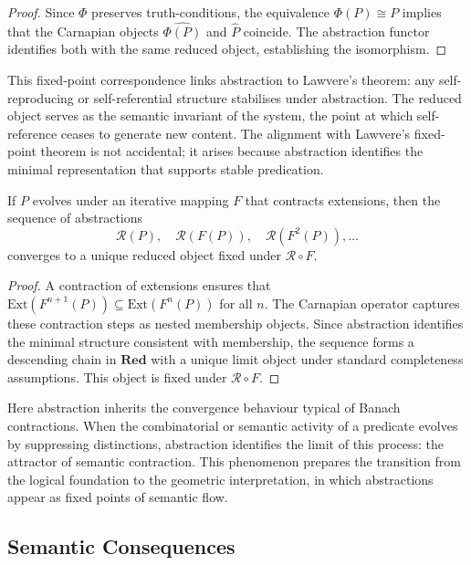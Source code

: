 \documentclass[12pt,letterpaper]{article}
\begin{document}
\begin{proof}
Since $\Phi$ preserves truth-conditions, the equivalence $\Phi(P) \cong P$ implies that the Carnapian objects $\hat{\Phi(P)}$ and $\hat{P}$ coincide. The abstraction functor identifies both with the same reduced object, establishing the isomorphism.
\end{proof}

This fixed-point correspondence links abstraction to Lawvere’s theorem: any self-reproducing or self-referential structure stabilises under abstraction. The reduced object serves as the semantic invariant of the system, the point at which self-reference ceases to generate new content. The alignment with Lawvere’s fixed-point theorem is not accidental; it arises because abstraction identifies the minimal representation that supports stable predication.

\begin{corollary}
If $P$ evolves under an iterative mapping $F$ that contracts extensions, then the sequence of abstractions
\[
\mathcal{R}(P), \quad \mathcal{R}(F(P)), \quad \mathcal{R}(F^2(P)), \dots
\]
converges to a unique reduced object fixed under $\mathcal{R} \circ F$.
\end{corollary}

\begin{proof}
A contraction of extensions ensures that $\mathrm{Ext}(F^{n+1}(P)) \subseteq \mathrm{Ext}(F^n(P))$ for all $n$. The Carnapian operator captures these contraction steps as nested membership objects. Since abstraction identifies the minimal structure consistent with membership, the sequence forms a descending chain in $\mathbf{Red}$ with a unique limit object under standard completeness assumptions. This object is fixed under $\mathcal{R} \circ F$.
\end{proof}

Here abstraction inherits the convergence behaviour typical of Banach contractions. When the combinatorial or semantic activity of a predicate evolves by suppressing distinctions, abstraction identifies the limit of this process: the attractor of semantic contraction. This phenomenon prepares the transition from the logical foundation to the geometric interpretation, in which abstractions appear as fixed points of semantic flow.

\subsection*{Semantic Consequences}
\end{document}
